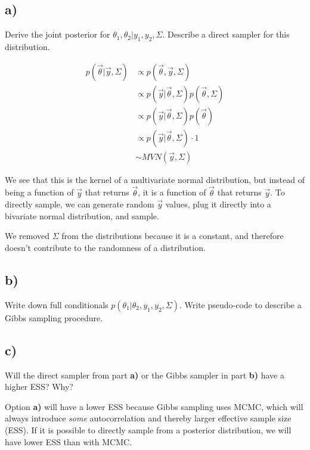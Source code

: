 \documentclass[titlepage, 12pt, leqno]{article}
\begin{document}
\subsection{a)}
\begin{ex}
    Derive the joint posterior for $\theta_{1}, \theta_{2}|y_{1},y_{2},
    \Sigma$. Describe a direct sampler for this distribution.
\end{ex}
\begin{align*}
    p(\vec \theta|\vec y, \Sigma) &\propto p(\vec \theta, \vec y, \Sigma)\\
              &\propto p(\vec y|\vec \theta, \Sigma)p(\vec \theta, \Sigma)\\
              &\propto p(\vec y|\vec \theta,\Sigma)p(\vec \theta)\\
              &\propto p(\vec y|\vec \theta, \Sigma) \cdot 1 \\
              &\sim MVN(\vec y, \Sigma)
\end{align*}

We see that this is the kernel of a multivariate normal distribution, but
instead of being a function of $\vec y$ that returns $\vec \theta$, it is a
function of $\vec \theta$ that returns $\vec y$. To directly sample, we can
generate random $\vec y$ values, plug it directly into a bivariate normal
distribution, and sample.

\begin{note}
    We removed $\Sigma$ from the distributions because it is a constant, and
    therefore doesn't contribute to the randomness of a distribution.
\end{note}


\subsection{b)}
\begin{ex}
    Write down full conditionals $p(\theta_{1}|\theta_{2},y_{1},y_{2},\Sigma)$.
    Write pseudo-code to describe a Gibbs sampling procedure.
\end{ex}

\subsection{c)}
\begin{ex}
    Will the direct sampler from part \textbf{a)} or the Gibbs sampler in part
    \textbf{b)} have a higher ESS? Why?
\end{ex}
Option \textbf{a)} will have a lower ESS because Gibbs sampling uses MCMC, which
will always introduce \textit{some} autocorrelation and thereby larger 
effective sample size (ESS). If it is possible to directly sample from a
posterior distribution, we will have lower ESS than with MCMC.
\end{document}
